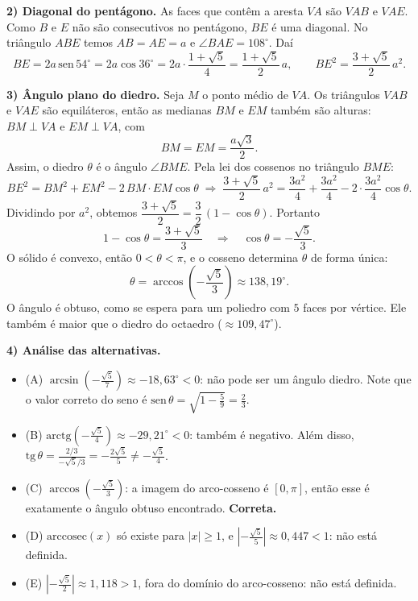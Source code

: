 \documentclass{article}%
\begin{document}
\textbf{2) Diagonal do pentágono.} As faces que contêm a aresta $VA$ são $VAB$ e $VAE$. Como $B$ e $E$ não são consecutivos no pentágono, $BE$ é uma diagonal. No triângulo $ABE$ temos $AB=AE=a$ e $\angle BAE=108^\circ$. Daí
\[
BE = 2a\,\mathrm{sen}\,54^\circ = 2a\cos 36^\circ = 2a\cdot\frac{1+\sqrt5}{4}=\frac{1+\sqrt5}{2}\,a ,
\qquad BE^2=\frac{3+\sqrt5}{2}\,a^2 .
\]

\textbf{3) Ângulo plano do diedro.} Seja $M$ o ponto médio de $VA$. Os triângulos $VAB$ e $VAE$ são equiláteros, então as medianas $BM$ e $EM$ também são alturas: $BM\perp VA$ e $EM\perp VA$, com
\[
BM=EM=\frac{a\sqrt3}{2}.
\]
Assim, o diedro $\theta$ é o ângulo $\angle BME$. Pela lei dos cossenos no triângulo $BME$:
\[
BE^2 = BM^2+EM^2-2\,BM\cdot EM\cos\theta
\;\Longrightarrow\;
\frac{3+\sqrt5}{2}\,a^2=\frac{3a^2}{4}+\frac{3a^2}{4}-2\cdot\frac{3a^2}{4}\cos\theta .
\]
Dividindo por $a^2$, obtemos $\dfrac{3+\sqrt5}{2}=\dfrac32\,(1-\cos\theta)$. Portanto
\[
1-\cos\theta=\frac{3+\sqrt5}{3}
\quad\Longrightarrow\quad
\boxed{\cos\theta=-\frac{\sqrt5}{3}}.
\]
O sólido é convexo, então $0<\theta<\pi$, e o cosseno determina $\theta$ de forma única:
\[
\theta=\arccos\left(-\frac{\sqrt5}{3}\right)\approx 138{,}19^\circ .
\]
O ângulo é obtuso, como se espera para um poliedro com $5$ faces por vértice. Ele também é maior que o diedro do octaedro ($\approx 109{,}47^\circ$).

\textbf{4) Análise das alternativas.}
\begin{itemize}
\item (A) $\arcsin\left(-\frac{\sqrt5}{7}\right)\approx -18{,}63^\circ<0$: não pode ser um ângulo diedro. Note que o valor correto do seno é $\mathrm{sen}\,\theta=\sqrt{1-\frac59}=\frac23$.
\item (B) $\mathrm{arctg}\left(-\frac{\sqrt5}{4}\right)\approx -29{,}21^\circ<0$: também é negativo. Além disso, $\mathrm{tg}\,\theta=\frac{2/3}{-\sqrt5/3}=-\frac{2\sqrt5}{5}\neq-\frac{\sqrt5}{4}$.
\item (C) $\arccos\left(-\frac{\sqrt5}{3}\right)$: a imagem do arco-cosseno é $[0,\pi]$, então esse é exatamente o ângulo obtuso encontrado. \textbf{Correta.}
\item (D) $\mathrm{arccosec}(x)$ só existe para $|x|\ge 1$, e $\left|-\frac{\sqrt5}{5}\right|\approx 0{,}447<1$: não está definida.
\item (E) $\left|-\frac{\sqrt5}{2}\right|\approx 1{,}118>1$, fora do domínio do arco-cosseno: não está definida.
\end{itemize}
\end{document}
